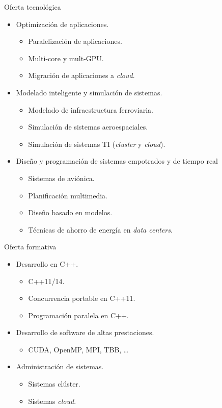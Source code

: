 \begin{frame}{Oferta tecnológica}
  \begin{itemize}
    \item Optimización de aplicaciones.
      \begin{itemize}
        \item Paralelización de aplicaciones.
        \item Multi-core y mult-GPU.
        \item Migración de aplicaciones a \emph{cloud}.
      \end{itemize}
    \item Modelado inteligente y simulación de sistemas.
      \begin{itemize}
        \item Modelado de infraestructura ferroviaria.
        \item Simulación de sistemas aeroespaciales.
        \item Simulación de sistemas TI (\emph{cluster} y \emph{cloud}).
      \end{itemize}
    \item Diseño y programación de sistemas empotrados y de tiempo real
      \begin{itemize}
        \item Sistemas de aviónica.
        \item Planificación multimedia.
        \item Diseño basado en modelos.
        \item Técnicas de ahorro de energía en \emph{data centers}.
      \end{itemize}
  \end{itemize}
\end{frame}

\begin{frame}{Oferta formativa}
  \begin{itemize}
    \item Desarrollo en C++.
      \begin{itemize}
        \item C++11/14.
        \item Concurrencia portable en C++11.
        \item Programación paralela en C++.
      \end{itemize}
    \vspace{1em}
    \item Desarrollo de software de altas prestaciones.
      \begin{itemize}
        \item CUDA, OpenMP, MPI, TBB, \ldots
      \end{itemize}
    \vspace{1em}
    \item Administración de sistemas.
      \begin{itemize}
        \item Sistemas clúster.
        \item Sistemas \emph{cloud}.
      \end{itemize}
  \end{itemize}
\end{frame}
